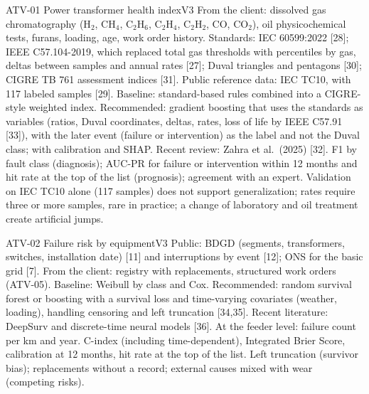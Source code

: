 \begin{ficha}{ATV-01 \textperiodcentered{} Power transformer health index}{V3}
 From the client: dissolved gas chromatography (H$_2$, CH$_4$,
C$_2$H$_6$, C$_2$H$_4$, C$_2$H$_2$, CO, CO$_2$), oil physicochemical tests,
furans, loading, age, work order history. Standards: IEC
60599:2022 [28]; IEEE C57.104-2019, which replaced total gas thresholds with
percentiles by gas, deltas between samples and annual rates [27]; Duval
triangles and pentagons [30]; CIGRE TB 761 assessment indices [31]. Public
reference data: IEC TC10, with 117 labeled samples [29].
 Baseline: standard-based rules combined into a
CIGRE-style weighted index. Recommended: gradient boosting that uses the standards
as variables (ratios, Duval coordinates, deltas, rates, loss of life
by IEEE C57.91 [33]), with the later event (failure or
intervention) as the label and not the Duval class; with calibration and SHAP. Recent review:
Zahra et al.\ (2025) [32].
 F1 by fault class (diagnosis); AUC-PR for failure or
intervention within 12 months and hit rate at the top of the list (prognosis); agreement
with an expert.
 Validation on IEC TC10 alone (117 samples) does not support
generalization;
rates require three or more samples, rare in practice; a change of laboratory and
oil treatment create artificial jumps.
\end{ficha}

\begin{ficha}{ATV-02 \textperiodcentered{} Failure risk by equipment}{V3}
 Public: BDGD (segments, transformers, switches, installation
date) [11] and interruptions by event [12]; ONS for the basic grid [7].
From the client: registry with replacements, structured work orders (ATV-05).
 Baseline: Weibull by class and Cox. Recommended:
random survival forest or boosting with a survival loss and
time-varying covariates (weather, loading), handling censoring and left
truncation [34,35]. Recent literature: DeepSurv and discrete-time
neural models [36]. At the feeder level: failure count per km and year.
 C-index (including time-dependent), Integrated Brier
Score, calibration at 12 months, hit rate at the top of the list.
 Left truncation (survivor bias); replacements without
a record; external causes mixed with wear (competing risks).
\end{ficha}

